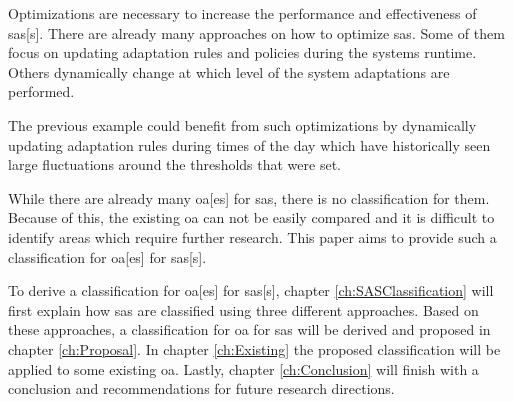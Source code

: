 \noindent Optimizations are necessary to increase the performance and effectiveness of \acrlong{sas}[s].
There are already many approaches on how to optimize \acrshort{sas}.
Some of them focus on updating adaptation rules and policies during the systems runtime.
Others dynamically change at which level of the system adaptations are performed.

\noindent The previous example could benefit from such optimizations by dynamically updating adaptation rules
during times of the day which have historically seen large fluctuations around the thresholds that were set.

\noindent While there are already many \acrfull{oa}[es] for \acrshort{sas},
there is no classification for them.
Because of this, the existing \acrshort{oa} can not be easily compared
and it is difficult to identify areas which require further research.
This paper aims to provide such a classification for \acrlong{oa}[es] for \acrlong{sas}[s].

\noindent To derive a classification for \acrlong{oa}[es] for \acrlong{sas}[s],
chapter \ref{ch:SASClassification} will first explain how \acrshort{sas} are classified
using three different approaches.
Based on these approaches, a classification for \acrshort{oa} for \acrshort{sas} will be derived
and proposed in chapter \ref{ch:Proposal}.
In chapter \ref{ch:Existing} the proposed classification will be applied to some existing \acrshort{oa}.
Lastly, chapter \ref{ch:Conclusion} will finish with a conclusion and recommendations for future research directions.
